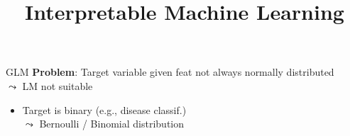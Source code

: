 \documentclass[10pt,compress,t,notes=noshow, xcolor=table]{beamer}
\title{Interpretable Machine Learning}
\date{}
\begin{document}

\begin{frame}{GLM }
\vspace{-0.2cm}
\textbf{Problem}: Target variable given feat not always normally distributed \\$\leadsto$ LM not suitable

\begin{itemize}
    \item Target is binary (e.g., disease classif.)\\
    $\leadsto$ Bernoulli / Binomial distribution
\end{itemize}
\begin{splitVCC}[0.5]{

}
\end{splitVCC}
\end{frame}
\end{document}
